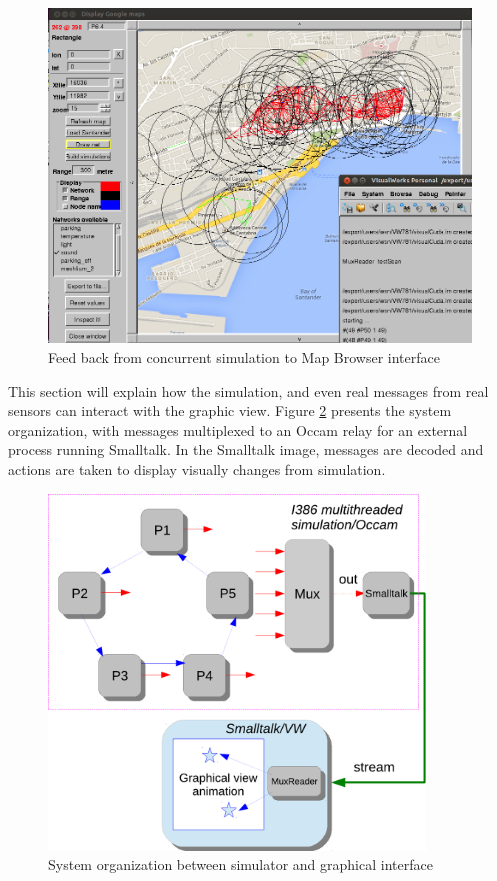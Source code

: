\begin{figure}[hbtp]
\begin{center}
\leavevmode 
\includegraphics[width=12cm] {netSimul.png}
\caption{Feed back from concurrent simulation to Map Browser interface}
\label{fig:netSimul}
\end{center}
\end{figure}
 

This section will explain how the simulation, and even real messages from real sensors
can interact with the graphic view. Figure \ref{fig:mux4-st} presents the system organization, with
messages multiplexed to an Occam relay for an external process running Smalltalk.
In the Smalltalk image, messages are decoded and actions are taken to display visually
changes from simulation.

\begin{figure}[hbtp]
\begin{center} 
\includegraphics[width=10cm] {mux4-st.pdf}
\caption{System organization between simulator and graphical interface}
\label{fig:mux4-st}
\end{center}
\end{figure}
 

